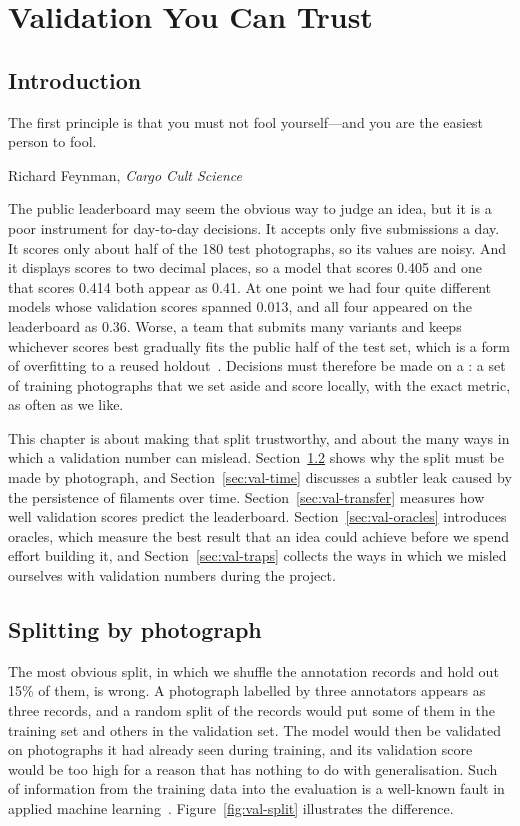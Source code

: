 \chapter{Validation You Can Trust}\label{ch:validation}

\section{Introduction}\label{sec:val-why}
\epigraph{The first principle is that you must not fool yourself---and you are the easiest person
to fool.}{Richard Feynman, \emph{Cargo Cult Science} \citeyearpar{feynman1974}}

The public leaderboard may seem the obvious way to judge an idea, but it is a poor instrument for
day-to-day decisions. It accepts only five submissions a day. It scores only about half of the 180
test photographs, so its values are noisy. And it displays scores to two decimal places, so a model
that scores 0.405 and one that scores 0.414 both appear as 0.41. At one point we had four
quite different models whose validation scores spanned 0.013, and all four appeared on the
leaderboard as 0.36. Worse, a team that submits many variants and keeps whichever scores best
gradually fits the public half of the test set, which is a form of overfitting to a reused
holdout~\citep{dwork2015,blum2015}. Decisions must therefore be made on a : a set of
training photographs that we set aside and score locally, with the exact metric, as often as we
like.

This chapter is about making that split trustworthy, and about the many ways in which a validation
number can mislead. Section~\ref{sec:val-split} shows why the split must be made by photograph,
and Section~\ref{sec:val-time} discusses a subtler leak caused by the persistence of filaments over
time. Section~\ref{sec:val-transfer} measures how well validation scores predict the leaderboard.
Section~\ref{sec:val-oracles} introduces oracles, which measure the best result that an idea could
achieve before we spend effort building it, and Section~\ref{sec:val-traps} collects the
ways in which we misled ourselves with validation numbers during the project.

\section{Splitting by photograph}\label{sec:val-split}
The most obvious split, in which we shuffle the \AllRecords{} annotation records and hold out 15\%
of them, is wrong. A photograph labelled by three annotators appears as three records, and a random
split of the records would put some of them in the training set and others in the validation set.
The model would then be validated on photographs it had already seen during training, and its
validation score would be too high for a reason that has nothing to do with generalisation. Such
 of information from the training data into the evaluation is a well-known fault
in applied machine learning~\citep{kaufman2012}.
Figure~\ref{fig:val-split} illustrates the difference.

